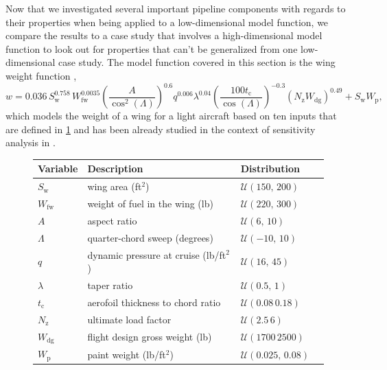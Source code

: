 \documentclass[
  a4paper,  %
  twoside,  %
  bibliography=totoc,
  headsepline,
  cleardoublepage=empty,
  parskip=half,
  draft=false
]{scrbook}
\begin{document}
Now that we investigated several important pipeline components with regards to their properties when being applied to a low-dimensional model function, we compare the results to a case study that involves a high-dimensional model function to look out for properties that can't be generalized from one low-dimensional case study.
The model function covered in this section is the wing weight function \cite{Forrester2008},
\begin{equation}
w=0.036 \, S_\mathrm{w}^{0.758} \, W_\mathrm{fw}^{0.0035} \left(\frac{A}{\cos^2(\Lambda)}\right)^{0.6} q^{0.006} \lambda^{0.04} \left( \frac{100 t_\mathrm{c}}{\cos(\Lambda)} \right)^{-0.3} (N_\mathrm{z} W_\mathrm{dg})^{0.49} + S_\mathrm{w} W_\mathrm{p},
\end{equation}
which models the weight of a wing for a light aircraft based on ten inputs that are defined in \cref{tab:ww_params} and  has been already studied in the context of sensitivity analysis in \cite{Moon2012}.
\begin{mdframed}[style=style]
\begin{figure}[H]
\vspace{-2mm}
\centering
\bgroup
\def\arraystretch{1.2}%
  \begin{tabular}{ l l l l}
Variable & Description & Distribution\\
\hline
$S_{\mathrm{w}}$ & wing area (ft$^2$) & $\mathcal{U}(150,\, 200)$\\
$W_{\mathrm{fw}}$ & weight of fuel in the wing (lb) & $\mathcal{U}(220,\, 300)$\\
$A$ & aspect ratio & $\mathcal{U}(6,\, 10)$\\
$\Lambda$ & quarter-chord sweep (degrees) & $\mathcal{U}(-10 ,\,  10)$\\
$q$ & dynamic pressure at cruise (lb/ft$^2$) & $\mathcal{U}(16,\, 45)$\\
$\lambda$ & taper ratio & $\mathcal{U}(0.5, \, 1)$\\
$t_\mathrm{c}$ & aerofoil thickness to chord ratio & $\mathcal{U}(0.08\, 0.18)$\\
$N_\mathrm{z}$ & ultimate load factor & $\mathcal{U}(2.5\, 6)$\\
$W_\mathrm{dg}$ & flight design gross weight (lb)& $\mathcal{U}(1700\, 2500)$\\
$W_\mathrm{p}$ & paint weight (lb/ft$^2$) & $\mathcal{U}(0.025,\, 0.08)$\\
\end{tabular}
\egroup\\
\vspace{0.5em}
\delimit
{}
\label{tab:ww_params}
\end{figure}
\end{mdframed}
\end{document}
